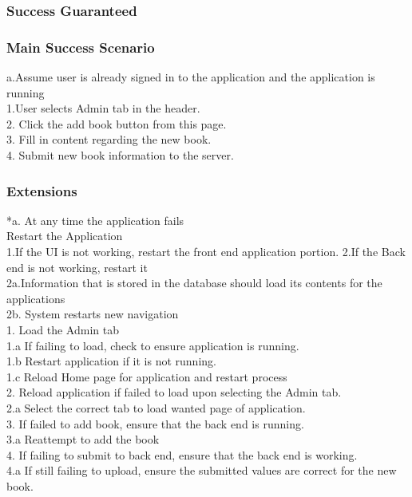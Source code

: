 \documentclass{article}
\begin{document}
	\subsubsection{\textbf{Success Guaranteed}}
	
	\subsubsection{\textbf{Main Success Scenario}}
	a.Assume user is already signed in to the application and the application is running\\
	1.User selects Admin tab in the header. \\
	2. Click the add book button from this page. \\
	3. Fill in content regarding the new book. \\
	4. Submit new book information to the server. \\
	
	
	\subsubsection{\textbf{Extensions}}
	*a. At any time the application fails \\
	Restart the Application \\
	1.If the UI is not working, restart the front end application portion.
	2.If the Back end is not working, restart it \\
	2a.Information that is stored in the database should load its contents for the applications \\
	2b. System restarts new navigation \\
	1. Load the Admin tab \\
	1.a  If failing to load, check to ensure application is running. \\
	1.b Restart application if it is not running. \\
	1.c Reload Home page for application and restart process \\
	2. Reload application if failed to load upon selecting the Admin tab. \\
	2.a Select the correct tab to load wanted page of application.\\
	3. If failed to add book, ensure that the back end is running. \\
	3.a Reattempt to add the book\\
	4. If failing to submit to back end, ensure that the back end is working. \\
	4.a If still failing to upload, ensure the submitted values are correct for the new book. \\
	
\end{document}
